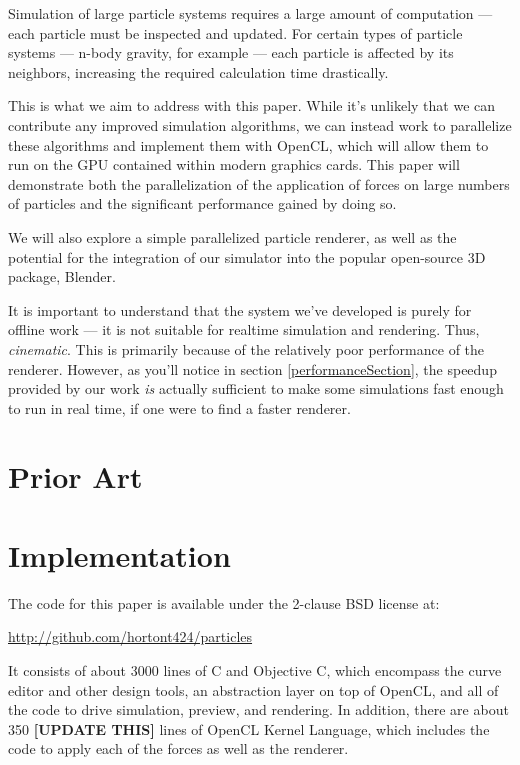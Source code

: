 \documentclass{acmsiggraph}
\begin{document}
Simulation of large particle systems requires a large amount of computation --- each particle must be inspected and updated. For certain types of particle systems --- n-body gravity, for example --- each particle is affected by its neighbors, increasing the required calculation time drastically.

This is what we aim to address with this paper. While it's unlikely that we can contribute any improved simulation algorithms, we can instead work to parallelize these algorithms and implement them with OpenCL, which will allow them to run on the GPU contained within modern graphics cards. This paper will demonstrate both the parallelization of the application of forces on large numbers of particles and the significant performance gained by doing so.

We will also explore a simple parallelized particle renderer, as well as the potential for the integration of our simulator into the popular open-source 3D package, Blender.

It is important to understand that the system we've developed is purely for offline work --- it is not suitable for realtime simulation and rendering. Thus, {\it cinematic}. This is primarily because of the relatively poor performance of the renderer. However, as you'll notice in section \ref{performanceSection}, the speedup provided by our work {\it is} actually sufficient to make some simulations fast enough to run in real time, if one were to find a faster renderer.

\section{Prior Art}

\section{Implementation}

The code for this paper is available under the 2-clause BSD license at:

\url{http://github.com/hortont424/particles}

It consists of about 3000 lines of C and Objective C, which encompass the curve editor and other design tools, an abstraction layer on top of OpenCL, and all of the code to drive simulation, preview, and rendering. In addition, there are about 350 {\bf [UPDATE THIS]} lines of OpenCL Kernel Language, which includes the code to apply each of the forces as well as the renderer.
\end{document}
